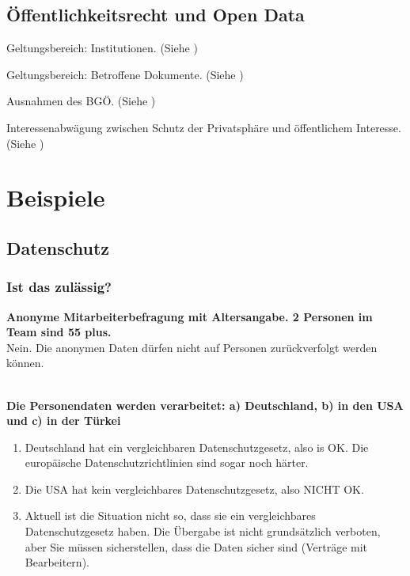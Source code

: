 \subsection{Öffentlichkeitsrecht und Open Data}
\begin{description}
	\tightlist
	\item[Art. 2 BGÖ] Geltungsbereich: Institutionen.
	(Siehe )

	\item[Art. 5 BGÖ] Geltungsbereich: Betroffene Dokumente.
	(Siehe )

	\item[Art. 7 BGÖ] Ausnahmen des BGÖ.
	(Siehe )

	\item[Art. 6 BGÖ] Interessenabwägung zwischen Schutz der
	Privatsphäre und öffentlichem Interesse.
	(Siehe )
\end{description}

\section{Beispiele}

\subsection{Datenschutz}

\subsubsection{Ist das zulässig?}

\textbf{Anonyme Mitarbeiterbefragung mit Altersangabe. 2 Personen im
Team sind 55 plus.}\\
Nein. Die anonymen Daten dürfen nicht auf Personen zurückverfolgt werden
können.

\mbox{}\\
\textbf{Die Personendaten werden verarbeitet: a) Deutschland, b) in den
USA und c) in der Türkei}

\begin{enumerate}
	\tightlist
	\item Deutschland hat ein vergleichbaren Datenschutzgesetz, also is OK. Die
	europäische Datenschutzrichtlinien sind sogar noch härter.
	\item Die USA hat kein vergleichbares Datenschutzgesetz, also NICHT OK.
	\item Aktuell ist die Situation nicht so, dass sie ein vergleichbares
	Datenschutzgesetz haben. Die Übergabe ist nicht grundsätzlich
	verboten, aber Sie müssen sicherstellen, dass die Daten sicher sind
	(Verträge mit Bearbeitern).
\end{enumerate}

